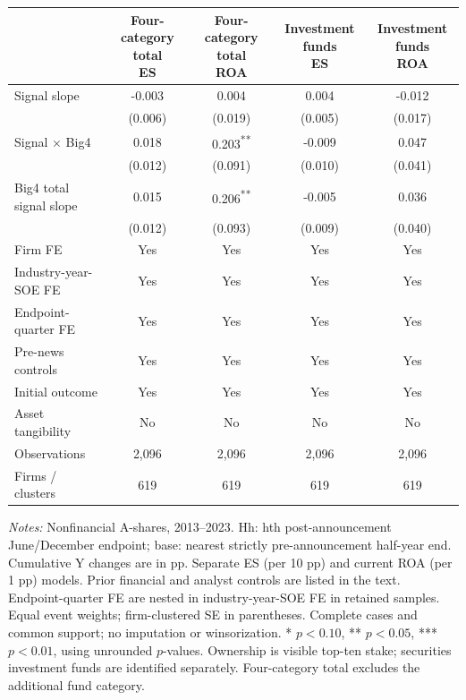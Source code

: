 \documentclass[10pt]{article}
\newcommand{\sym}[1]{\textsuperscript{#1}}
\begin{document}
\begin{minipage}{21cm}\fontsize{10.5}{13}\selectfont\centering
\setlength{\tabcolsep}{4pt}\renewcommand{\arraystretch}{1.12}
\begin{tabular*}{\textwidth}{@{\extracolsep{\fill}}lcccc@{}}\toprule
 & \shortstack{Four-category total\\ES} & \shortstack{Four-category total\\ROA} & \shortstack{Investment funds\\ES} & \shortstack{Investment funds\\ROA} \\
\midrule
Signal slope & -0.003 & 0.004 & 0.004 & -0.012 \\
 & (0.006) & (0.019) & (0.005) & (0.017) \\
Signal $\times$ Big4 & 0.018 & 0.203\sym{**} & -0.009 & 0.047 \\
 & (0.012) & (0.091) & (0.010) & (0.041) \\
Big4 total signal slope & 0.015 & 0.206\sym{**} & -0.005 & 0.036 \\
 & (0.012) & (0.093) & (0.009) & (0.040) \\
\addlinespace
Firm FE & Yes & Yes & Yes & Yes \\
Industry-year-SOE FE & Yes & Yes & Yes & Yes \\
Endpoint-quarter FE & Yes & Yes & Yes & Yes \\
Pre-news controls & Yes & Yes & Yes & Yes \\
Initial outcome & Yes & Yes & Yes & Yes \\
Asset tangibility & No & No & No & No \\
Observations & 2,096 & 2,096 & 2,096 & 2,096 \\
Firms / clusters & 619 & 619 & 619 & 619 \\
\bottomrule\end{tabular*}
\par\medskip\raggedright\fontsize{9}{11}\selectfont
\textit{Notes:} Nonfinancial A-shares, 2013--2023. Hh: hth post-announcement June/December endpoint; base: nearest strictly pre-announcement half-year end. Cumulative Y changes are in pp. Separate ES (per 10 pp) and current ROA (per 1 pp) models. Prior financial and analyst controls are listed in the text. Endpoint-quarter FE are nested in industry-year-SOE FE in retained samples. Equal event weights; firm-clustered SE in parentheses. Complete cases and common support; no imputation or winsorization. * $p<0.10$, ** $p<0.05$, *** $p<0.01$, using unrounded $p$-values. Ownership is visible top-ten stake; securities investment funds are identified separately. Four-category total excludes the additional fund category.
\end{minipage}
\end{document}
